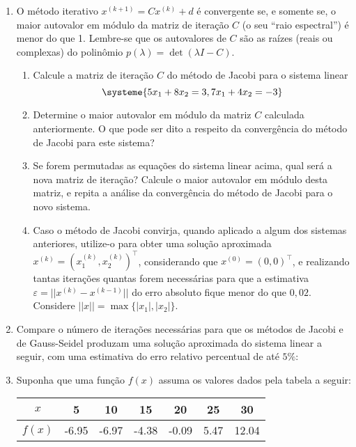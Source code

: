 \documentclass[12pt,a4paper]{article}
\begin{document}
\begin{enumerate}
\item O método iterativo $x^{(k+1)} = C x^{(k)} + d$ é convergente se, e somente se, o maior autovalor em módulo da matriz de iteração $C$ (o seu ``raio espectral'') é menor do que 1. Lembre-se que os autovalores de $C$ são as raízes (reais ou complexas) do polinômio $p( \lambda ) = \det( \lambda I - C)$.
\begin{enumerate}
\item Calcule a matriz de iteração $C$ do método de Jacobi para o sistema linear
\[
\systeme{
5x_1 + 8x_2 =  3,
7x_1 + 4x_2 = -3
}
\]
\item Determine o maior autovalor em módulo da matriz $C$ calculada anteriormente. O que pode ser dito a respeito da convergência do método de Jacobi para este sistema?
\item Se forem permutadas as equações do sistema linear acima, qual será a nova matriz de iteração? Calcule o maior autovalor em módulo desta matriz, e repita a análise da convergência do método de Jacobi para o novo sistema.
\item Caso o método de Jacobi convirja, quando aplicado a algum dos sistemas anteriores, utilize-o para obter uma solução aproximada $x^{(k)} = \left(x_1^{(k)}, x_2^{(k)}\right)^\intercal$, considerando que $x^{(0)} = (0, 0)^\intercal$, e realizando tantas iterações quantas forem necessárias para que a estimativa $\varepsilon = || x^{(k)} - x^{(k-1)} ||$ do erro absoluto fique menor do que $0,02$. Considere $|| x || = \max\{|x_1|, |x_2|\}$.
\end{enumerate}
\item Compare o número de iterações necessárias para que os métodos de Jacobi e de Gauss-Seidel produzam uma solução aproximada do sistema linear a seguir, com uma estimativa do erro relativo percentual de até $5\%$:

\item Suponha que uma função $f(x)$ assuma os valores dados pela tabela a seguir:
\begin{center}
\begin{tabular}{|c|c|c|c|c|c|c|}
\hline
   $x$ &  5    & 10     & 15 & 20 & 25 & 30 \\
\hline
$f(x)$ & -6.95 & -6.97  & -4.38 & -0.09 & 5.47 & 12.04\\
\hline
\end{tabular}
\end{center}


\end{enumerate}
\end{document}

